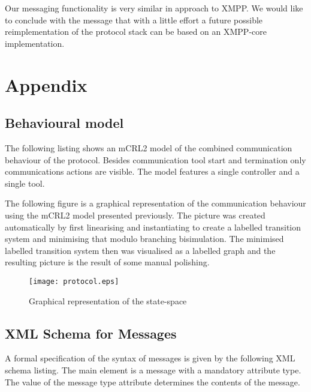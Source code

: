 \documentclass{article}
\begin{document}
   Our messaging functionality is very similar in approach to XMPP. We would
   like to conclude with the message that with a little effort a future
   possible reimplementation of the protocol stack can be based on an XMPP-core
   implementation.

  \enlargethispage*{4pt}
  

  \section{Appendix}
  \pagestyle{empty}

  \subsection{Behavioural model}
  The following listing shows an mCRL2 model of the combined communication
  behaviour of the protocol. Besides communication tool start and termination
  only communications actions are visible. The model features a single
  controller and a single tool.

  \small  \normalsize

  \pagebreak

  The following figure is a graphical representation of the communication
  behaviour using the mCRL2 model presented previously. The picture was created
  automatically by first linearising and instantiating to create a labelled
  transition system and minimising that modulo branching bisimulation. The
  minimised labelled transition system then was visualised as a labelled graph
  and the resulting picture is the result of some manual polishing.

  \begin{figure}[H]
   \texttt{[image: protocol.eps]}
   \caption{Graphical representation of the state-space}
  \end{figure}

  \subsection{XML Schema for Messages}
  \label{subsection:xml_schema_messages}

  A formal specification of the syntax of messages is given by the following
  XML schema listing. The main element is a message with a mandatory attribute
  type. The value of the message type attribute determines the contents of the
  message.
\end{document}
